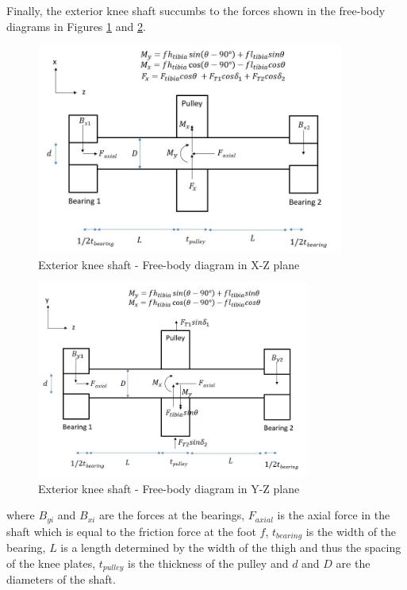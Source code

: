Finally, the exterior knee shaft succumbs to the forces shown in the free-body diagrams in Figures \ref{fig:shaft_knee_fbd1} and \ref{fig:shaft_knee_fbd2}.

\begin{figure}
    \centering
    \includegraphics[width=0.9\textwidth]{4_Analysis/img/Shafts/ShaftKneeXZ.JPG}
    \caption{Exterior knee shaft - Free-body diagram in X-Z plane}
    \label{fig:shaft_knee_fbd1}
\end{figure}

\begin{figure}
    \centering
    \includegraphics[width=0.8\textwidth]{4_Analysis/img/Shafts/ShaftKneeYZ.JPG}
    \caption{Exterior knee shaft - Free-body diagram in Y-Z plane}
    \label{fig:shaft_knee_fbd2}
\end{figure}

where $B_{yi}$ and $B_{xi}$ are the forces at the bearings, $F_{axial}$ is the axial force in the shaft which is equal to the friction force at the foot $f$, $t_{bearing}$ is the width of the bearing, $L$ is a length determined by the width of the thigh and thus the spacing of the knee plates, $t_{pulley}$ is the thickness of the pulley and $d$ and $D$ are the diameters of the shaft.


